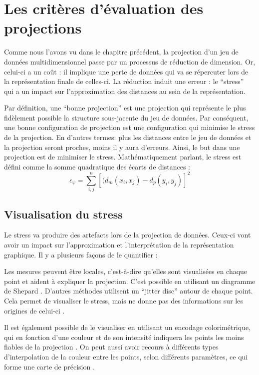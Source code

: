 \section{Les critères d'évaluation des projections}

Comme nous l’avons vu dans le chapitre précédent, la projection d'un jeu de données multidimensionnel passe par un processus de réduction de dimension. 
Or, celui-ci a un coût : il implique une perte de données qui va se répercuter lors de la représentation finale de celles-ci.\smallskip
La réduction induit une erreur : le “stress” qui a un impact sur l’approximation des distances au sein de la représentation.

Par définition, une “bonne projection” est une projection qui représente le plus fidèlement
possible la structure sous-jacente du jeu de données. Par conséquent, une
bonne configuration de projection est une configuration qui minimise le stress de la
projection. En d'autres termes: plus les distances entre le jeu de données et la projection seront proches, moins il y aura d’erreurs.
Ainsi, le but dans une projection est de minimiser le stress. \newline 
Mathématiquement parlant, le stress est défini comme la somme
quadratique des écarts de distances :  \[\epsilon_\psi = \sum_{i,j}^{n}[(d_m (x_i , x_j )- d_p (y_i ,y_j )]^{2} \] 


\subsection{Visualisation du stress}

Le stress va produire des artefacts lors de la projection de données. Ceux-ci vont
avoir un impact sur l’approximation et l'interprétation de la représentation graphique. Il y a
plusieurs façons de le quantifier :

Les mesures peuvent être locales, c'est-à-dire qu'elles sont visualisées en chaque point et aident à expliquer
la projection. C’est possible en utilisant un diagramme de Shepard \cite{kruskal1964multidimensional} \cite{HeulotThese}.
D'autres méthodes utilisent un “jitter disc” autour de chaque point. Cela permet de visualiser le
stress, mais ne donne pas des informations sur les origines de celui-ci \cite{HeulotAnEvaluation}.

Il est également possible de le visualiser en utilisant un encodage colorimétrique, qui en
fonction d’une couleur et de son intensité indiquera les points les moins fiables de la
projection \cite{CheckViz}.
On peut aussi avoir recours à différents types d’interpolation de la couleur entre les points,
selon différents paramètres, ce qui forme une carte de précision \cite{schreck2010techniques}.
\smallskip

